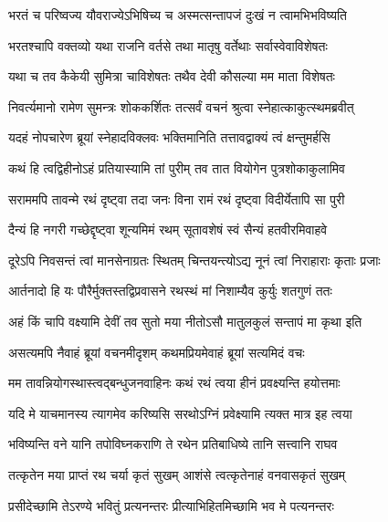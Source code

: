 \twolineshloka
{भरतं च परिष्वज्य यौवराज्येऽभिषिच्य च}
{अस्मत्सन्तापजं दुःखं न त्वामभिभविष्यति} %

\twolineshloka
{भरतश्चापि वक्तव्यो यथा राजनि वर्तसे}
{तथा मातृषु वर्तेथाः सर्वास्वेवाविशेषतः} %

\twolineshloka
{यथा च तव कैकेयी सुमित्रा चाविशेषतः}
{तथैव देवी कौसल्या मम माता विशेषतः} %

\twolineshloka
{निवर्त्यमानो रामेण सुमन्त्रः शोककर्शितः}
{तत्सर्वं वचनं श्रुत्वा स्नेहात्काकुत्स्थमब्रवीत्} %

\twolineshloka
{यदहं नोपचारेण ब्रूयां स्नेहादविक्लवः}
{भक्तिमानिति तत्तावद्वाक्यं त्वं क्षन्तुमर्हसि} %

\twolineshloka
{कथं हि त्वद्विहीनोऽहं प्रतियास्यामि तां पुरीम्}
{तव तात वियोगेन पुत्रशोकाकुलामिव} %

\twolineshloka
{सराममपि तावन्मे रथं दृष्ट्वा तदा जनः}
{विना रामं रथं दृष्ट्वा विदीर्येतापि सा पुरी} %

\twolineshloka
{दैन्यं हि नगरी गच्छेद्दृष्ट्वा शून्यमिमं रथम्}
{सूतावशेषं स्वं सैन्यं हतवीरमिवाहवे} %

\twolineshloka
{दूरेऽपि निवसन्तं त्वां मानसेनाग्रतः स्थितम्}
{चिन्तयन्त्योऽद्य नूनं त्वां निराहाराः कृताः प्रजाः} %

\twolineshloka
{आर्तनादो हि यः पौरैर्मुक्तस्तद्विप्रवासने}
{रथस्थं मां निशाम्यैव कुर्युः शतगुणं ततः} %

\twolineshloka
{अहं किं चापि वक्ष्यामि देवीं तव सुतो मया}
{नीतोऽसौ मातुलकुलं सन्तापं मा कृथा इति} %

\twolineshloka
{असत्यमपि नैवाहं ब्रूयां वचनमीदृशम्}
{कथमप्रियमेवाहं ब्रूयां सत्यमिदं वचः} %

\twolineshloka
{मम तावन्नियोगस्थास्त्वद्बन्धुजनवाहिनः}
{कथं रथं त्वया हीनं प्रवक्ष्यन्ति हयोत्तमाः} %

\twolineshloka
{यदि मे याचमानस्य त्यागमेव करिष्यसि}
{सरथोऽग्निं प्रवेक्ष्यामि त्यक्त मात्र इह त्वया} %

\twolineshloka
{भविष्यन्ति वने यानि तपोविघ्नकराणि ते}
{रथेन प्रतिबाधिष्ये तानि सत्त्वानि राघव} %

\twolineshloka
{तत्कृतेन मया प्राप्तं रथ चर्या कृतं सुखम्}
{आशंसे त्वत्कृतेनाहं वनवासकृतं सुखम्} %

\twolineshloka
{प्रसीदेच्छामि तेऽरण्ये भवितुं प्रत्यनन्तरः}
{प्रीत्याभिहितमिच्छामि भव मे पत्यनन्तरः} %

